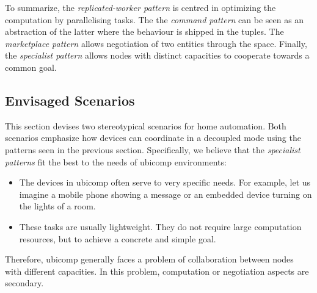 To summarize, the \emph{replicated-worker pattern} is centred in optimizing the computation by parallelising tasks.
The the \emph{command pattern} can be seen as an abstraction of the latter where the behaviour is shipped in the tuples.
The \emph{marketplace pattern} allows negotiation of two entities through the space.
Finally, the \emph{specialist pattern} allows nodes with distinct capacities to cooperate towards a common goal.




\subsection{Envisaged Scenarios} %
\label{sec:envisaged_scenarios}

This section devises two stereotypical scenarios for home automation.
Both scenarios emphasize how devices can coordinate in a decoupled mode using the patterns seen in the previous section. %
Specifically, we believe that the \emph{specialist patterns} fit the best to the needs of \ac{ubicomp} environments:
\begin{itemize}
  \item The devices in \ac{ubicomp} often serve to very specific needs.
        For example, let us imagine a mobile phone showing a message or an embedded device turning on the lights of a room. %
  \item These tasks are usually lightweight. %
        They do not require large computation resources, but to achieve a concrete and simple goal. %
\end{itemize}
Therefore, \ac{ubicomp} generally faces a problem of collaboration between nodes with different capacities.
In this problem, computation or negotiation aspects are secondary. %


